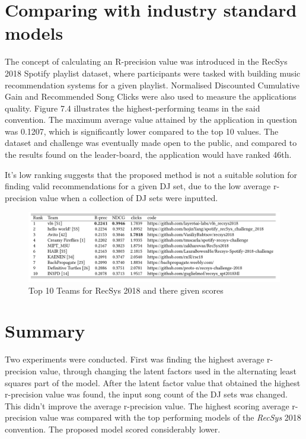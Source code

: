 \section{Comparing with industry standard models}

	The concept of calculating an R-precision value was introduced in the RecSys 2018 Spotify playlist dataset, where participants were tasked with building music recommendation systems for a given playlist. Normalised Discounted Cumulative Gain and Recommended Song Clicks were also used to measure the applications quality. Figure 7.4 illustrates the highest-performing teams in the said convention. The maximum average value attained by the application in question was 0.1207, which is significantly lower compared to the top 10 values. The dataset and challenge was eventually made open to the public, and compared to the results found on the leader-board, the application would have ranked 46th. 

It's low ranking suggests that the proposed method is not a suitable solution for finding valid recommendations for a given DJ set, due to the low average r-precision value when a collection of DJ sets were inputted.
\begin{figure}[H]
	\hspace*{-0.5cm} 
	\includegraphics[scale=0.55]{images/recsys_scores}
	\caption{Top 10 Teams for RecSys 2018 and there given scores \citep{zamani_analysis_2019}} 
\end{figure}

\section{Summary}
Two experiments were conducted. First was finding the highest average r-precision value, through changing the latent factors used in the alternating least squares part of the model. After the latent factor value that obtained the highest r-precision value was found, the input song count of the DJ sets was changed. This didn't improve the average r-precision value. The highest scoring average r-precision value was compared with the top performing models of the \textit{RecSys} 2018 convention. The proposed model scored considerably lower. 
